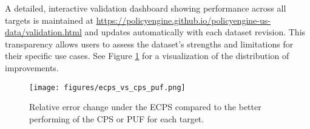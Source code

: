 A detailed, interactive validation dashboard showing performance across all targets is maintained at \url{https://policyengine.github.io/policyengine-us-data/validation.html} and updates automatically with each dataset revision. This transparency allows users to assess the dataset's strengths and limitations for their specific use cases. See Figure \ref{fig:ecps_vs_cps_puf} for a visualization of the distribution of improvements.

\begin{figure}[h]
    \centering
    \texttt{[image: figures/ecps\_vs\_cps\_puf.png]}
    \caption{Relative error change under the ECPS compared to the better performing of the CPS or PUF for each target.}
    \label{fig:ecps_vs_cps_puf}
\end{figure}

